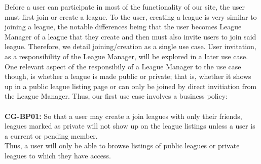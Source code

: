 
Before a user can participate in most of the functionality of our site, the user must first join or create a league. To the user, creating a league is very similar to joining a league, the notable differences being that the user becomes League Manager of a league that they create and then must also invite users to join said league. Therefore, we detail 
joining/creation as a single use case. User invitation, as a responsibility of the League Manager, will be explored in a later use case. One relevant aspect of the responsibily of a League Manager to the use case though, is whether a league is made public or private; that is, whether it shows up in a public league listing page or can only be joined by direct invitiation from the League Manager. Thus, our first use case involves a business policy: \\ \\
\textbf{CG-BP01:} So that a user may create a join leagues with only their friends, leagues marked as private will not show up on the league listings unless a user is a current or
pending member. \\

Thus, a user will only be able to browse listings of public leagues or private leagues to which they have access. \\

